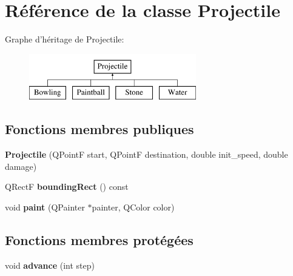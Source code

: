 \hypertarget{classProjectile}{
\section{Référence de la classe Projectile}
\label{classProjectile}
}
Graphe d'héritage de Projectile:\begin{figure}[H]
\begin{center}
\leavevmode
\includegraphics[height=2.000000cm]{classProjectile}
\end{center}
\end{figure}
\subsection*{Fonctions membres publiques}
\begin{DoxyCompactItemize}
\item 
\hypertarget{classProjectile_ab151a0ca022ef3f316c996886e226892}{
{\bfseries Projectile} (QPointF start, QPointF destination, double init\_\-speed, double damage)}
\label{classProjectile_ab151a0ca022ef3f316c996886e226892}

\item 
\hypertarget{classProjectile_a0e0b18909c9c154404384707c6515802}{
QRectF {\bfseries boundingRect} () const }
\label{classProjectile_a0e0b18909c9c154404384707c6515802}

\item 
\hypertarget{classProjectile_aef0d6ffcea7620988cf5446d0c1133fa}{
void {\bfseries paint} (QPainter $\ast$painter, QColor color)}
\label{classProjectile_aef0d6ffcea7620988cf5446d0c1133fa}

\end{DoxyCompactItemize}
\subsection*{Fonctions membres protégées}
\begin{DoxyCompactItemize}
\item 
\hypertarget{classProjectile_a8e3b4bae49558a0febfce8c1accea72d}{
void {\bfseries advance} (int step)}
\label{classProjectile_a8e3b4bae49558a0febfce8c1accea72d}

\end{DoxyCompactItemize}
